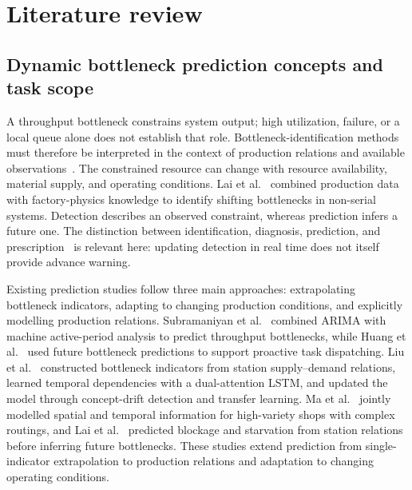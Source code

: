 \documentclass[a4paper,fleqn]{cas-dc}
\begin{document}
\section{Literature review} \label{sec:review}

\subsection{Dynamic bottleneck prediction concepts and task scope}

A throughput bottleneck constrains system output; high utilization, failure, or a local queue alone does not establish that role. Bottleneck-identification methods must therefore be interpreted in the context of production relations and available observations~\cite{subramaniyan2023throughput}. The constrained resource can change with resource availability, material supply, and operating conditions. Lai et al.~\cite{lai2021data} combined production data with factory-physics knowledge to identify shifting bottlenecks in non-serial systems. Detection describes an observed constraint, whereas prediction infers a future one. The distinction between identification, diagnosis, prediction, and prescription~\cite{subramaniyan2021ai} is relevant here: updating detection in real time does not itself provide advance warning.





Existing prediction studies follow three main approaches: extrapolating bottleneck indicators, adapting to changing production conditions, and explicitly modelling production relations. Subramaniyan et al.~\cite{subramaniyan2018data} combined ARIMA with machine active-period analysis to predict throughput bottlenecks, while Huang et al.~\cite{huang2019proactive} used future bottleneck predictions to support proactive task dispatching. Liu et al.~\cite{liu2023lstmdam} constructed bottleneck indicators from station supply--demand relations, learned temporal dependencies with a dual-attention LSTM, and updated the model through concept-drift detection and transfer learning. Ma et al.~\cite{ma2023tusb} jointly modelled spatial and temporal information for high-variety shops with complex routings, and Lai et al.~\cite{lai2023bstan} predicted blockage and starvation from station relations before inferring future bottlenecks. These studies extend prediction from single-indicator extrapolation to production relations and adaptation to changing operating conditions.
\end{document}
